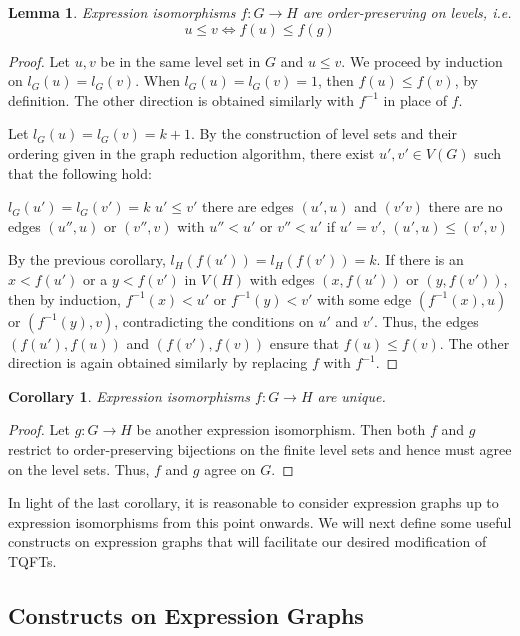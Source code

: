 \documentclass{amsart}
\renewcommand{\to}[1][]{\stackrel{#1}{\longrightarrow}}
\newcommand{\li}[1][]{\ifthenelse{\equal{#1}{}}{\item}{\item \label{#1}}}
\newenvironment{enmrt}{
  \enumerate[(i)]
  \setlength{\itemsep}{0pt}
}{
  \endenumerate
}
\numberwithin{thm}{section}
\newtheorem{lem}[thm]{Lemma}
\newtheorem{cor}[thm]{Corollary}
\theoremstyle{definition}
\begin{document}
\begin{lem}
Expression isomorphisms $f : G \to H$ are order-preserving on levels, i.e.
\[
  u \leq v \iff f(u) \leq f(g)
\]
\end{lem}
\begin{proof}
Let $u, v$ be in the same level set in $G$ and $u \leq v$. We proceed by
induction on $l_G(u) = l_G(v)$. When $l_G(u) = l_G(v) = 1$, then
$f(u) \leq f(v)$, by definition. The other direction is obtained similarly with
$f^{-1}$ in place of $f$.

Let $l_G(u) = l_G(v) = k + 1$. By the construction of level sets and their
ordering given in the graph reduction algorithm, there exist
$u', v' \in V(G)$ such that the following hold:
\begin{enmrt}
\li $l_G(u') = l_G(v') = k$
\li $u' \leq v'$
\li there are edges $(u', u)$ and $(v' v)$
\li there are no edges $(u'', u)$ or $(v'', v)$ with $u'' < u'$ or $v'' < u'$
\li if $u' = v'$, $(u', u) \leq (v', v)$
\end{enmrt}
By the previous corollary, $l_H(f(u')) = l_H(f(v')) = k$.
If there is an $x < f(u')$ or a $y < f(v')$ in $V(H)$ with edges
$(x, f(u'))$ or $(y, f(v'))$, then by induction, $f^{-1}(x) < u'$ or
$f^{-1}(y) < v'$ with some edge $(f^{-1}(x), u)$ or $(f^{-1}(y), v)$,
contradicting the conditions on $u'$ and $v'$. Thus, the edges $(f(u'), f(u))$
and $(f(v'), f(v))$ ensure that $f(u) \leq f(v)$. The other direction is again
obtained similarly by replacing $f$ with $f^{-1}$.
\end{proof}

\begin{cor}\label{cor:expiso_unique}
Expression isomorphisms $f : G \to H$ are unique.
\end{cor}
\begin{proof}
Let $g : G \to H$ be another expression isomorphism. Then both $f$ and $g$
restrict to order-preserving bijections on the finite level sets and hence must
agree on the level sets. Thus, $f$ and $g$ agree on $G$.
\end{proof}

In light of the last corollary, it is reasonable to consider expression graphs
up to expression isomorphisms from this point onwards. We will next define some
useful constructs on expression graphs that will facilitate our desired
modification of TQFTs.


%

\subsection{Constructs on Expression Graphs}
\end{document}
